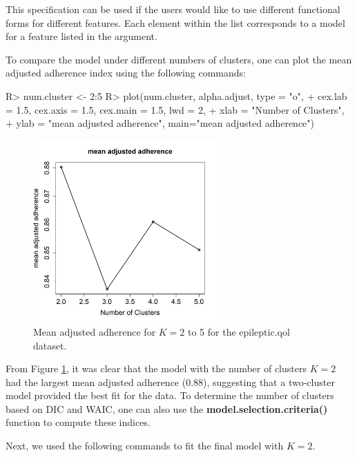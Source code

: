 This specification can be used if the users would like to use different functional forms for different features. Each element within the list corresponds to a model for a feature listed in the  argument.  

To compare the model under different numbers of clusters, one can plot the mean adjusted adherence index using the following commands: 

\begin{example}
R> num.cluster <- 2:5
R> plot(num.cluster, alpha.adjust, type = "o",
+        cex.lab = 1.5, cex.axis = 1.5, cex.main = 1.5, lwd = 2,
+        xlab = "Number of Clusters",
+        ylab = "mean adjusted adherence", main="mean adjusted adherence")
\end{example}

\begin{figure}[h]
\centering
\includegraphics[width=7cm,height=7cm]{./Figures/num_cluster.JPEG}
\caption{\label{fig:num_cluster} Mean adjusted adherence for $K = 2$ to 5 for the epileptic.qol dataset.}
\end{figure}

From Figure \ref{fig:num_cluster}, it was clear that the model with the number of clusters $K=2$ had the largest mean adjusted adherence (0.88), suggesting that a two-cluster model provided the best fit for the data. To determine the number of clusters based on DIC and WAIC, one can also use the \textbf{model.selection.criteria()} function to compute these indices.

Next, we used the following commands to fit the final model with $K=2$. 


